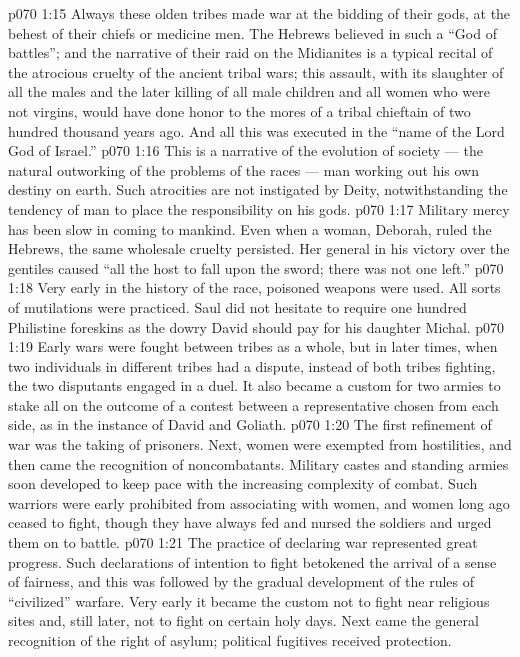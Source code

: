 \vs p070 1:15 \pc Always these olden tribes made war at the bidding of their gods, at the behest of their chiefs or medicine men. The Hebrews believed in such a “God of battles”; and the narrative of their raid on the Midianites is a typical recital of the atrocious cruelty of the ancient tribal wars; this assault, with its slaughter of all the males and the later killing of all male children and all women who were not virgins, would have done honor to the mores of a tribal chieftain of two hundred thousand years ago. And all this was executed in the “name of the Lord God of Israel.”
\vs p070 1:16 This is a narrative of the evolution of society --- the natural outworking of the problems of the races --- man working out his own destiny on earth. Such atrocities are not instigated by Deity, notwithstanding the tendency of man to place the responsibility on his gods.
\vs p070 1:17 \pc Military mercy has been slow in coming to mankind. Even when a woman, Deborah, ruled the Hebrews, the same wholesale cruelty persisted. Her general in his victory over the gentiles caused “all the host to fall upon the sword; there was not one left.”
\vs p070 1:18 Very early in the history of the race, poisoned weapons were used. All sorts of mutilations were practiced. Saul did not hesitate to require one hundred Philistine foreskins as the dowry David should pay for his daughter Michal.
\vs p070 1:19 Early wars were fought between tribes as a whole, but in later times, when two individuals in different tribes had a dispute, instead of both tribes fighting, the two disputants engaged in a duel. It also became a custom for two armies to stake all on the outcome of a contest between a representative chosen from each side, as in the instance of David and Goliath.
\vs p070 1:20 The first refinement of war was the taking of prisoners. Next, women were exempted from hostilities, and then came the recognition of noncombatants. Military castes and standing armies soon developed to keep pace with the increasing complexity of combat. Such warriors were early prohibited from associating with women, and women long ago ceased to fight, though they have always fed and nursed the soldiers and urged them on to battle.
\vs p070 1:21 The practice of declaring war represented great progress. Such declarations of intention to fight betokened the arrival of a sense of fairness, and this was followed by the gradual development of the rules of “civilized” warfare. Very early it became the custom not to fight near religious sites and, still later, not to fight on certain holy days. Next came the general recognition of the right of asylum; political fugitives received protection.
